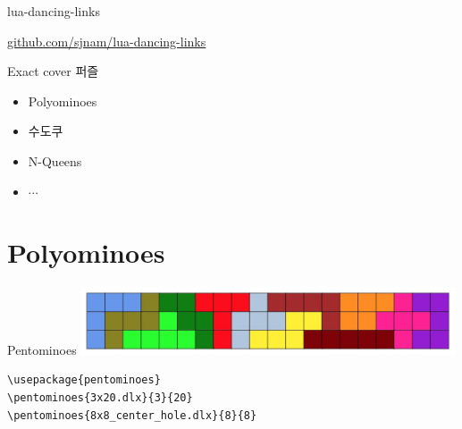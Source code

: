 \documentclass{beamer}
\begin{document}
%

%
\begin{frame}{lua-dancing-links}
\vfill
\begin{center}
\Large
  \href{https://github.com/sjnam/lua-dancing-links}
    {github.com/sjnam/lua-dancing-links}
\end{center}
\vfill
\end{frame}

%
\begin{frame}{Exact cover 퍼즐}
  \begin{itemize}
  \item Polyominoes
  \item 수도쿠
  \item N-Queens
  \item $\cdots$
  \end{itemize}
\end{frame}


\section{Polyominoes}

%

%
\begin{frame}[fragile]{Pentominoes}
\centering\includegraphics[height=2cm]{3x20.jpg}
\begin{verbatim}
\usepackage{pentominoes}
\pentominoes{3x20.dlx}{3}{20}
\pentominoes{8x8_center_hole.dlx}{8}{8}
\end{verbatim}  
\end{frame}
\end{document}
